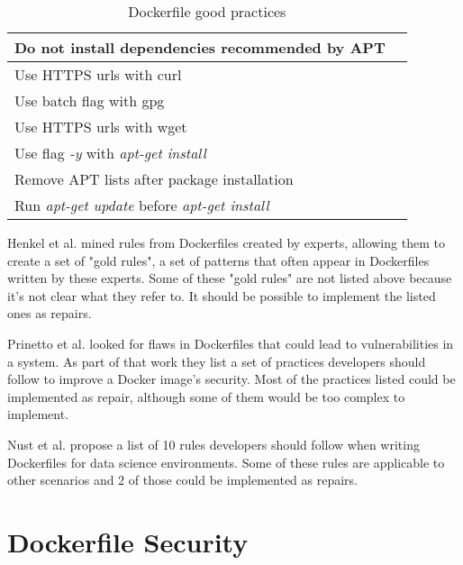 \begin{table}[H]
\begin{tabular}{|p{}|p{}|}
        \hline Do not install dependencies recommended by APT & \cite{henkelLearningUnderstandingSupporting2020} \\
        \hline Use HTTPS urls with curl & \cite{henkelLearningUnderstandingSupporting2020} \\
        \hline Use batch flag with gpg & \cite{henkelLearningUnderstandingSupporting2020} \\
        \hline Use HTTPS urls with wget & \cite{henkelLearningUnderstandingSupporting2020} \\
        \hline Use flag \textit{-y} with \textit{apt-get install} & \cite{henkelLearningUnderstandingSupporting2020} \\
        \hline Remove APT lists after package installation & \cite{henkelLearningUnderstandingSupporting2020} \\
        \hline Run \textit{apt-get update} before \textit{apt-get install} & \cite{henkelLearningUnderstandingSupporting2020} \\
        \hline
    \end{tabular}
    \caption{Dockerfile good practices}
    \label{tab:dockerfile_good_practices}
\end{table}

Henkel et al. \cite{henkelLearningUnderstandingSupporting2020} mined rules from Dockerfiles created by experts, allowing them to create a set of "gold rules", a set of patterns that often appear in Dockerfiles written by these experts. Some of these "gold rules" are not listed above because it's not clear what they refer to. It should be possible to implement the listed ones as repairs.

Prinetto et al. \cite{prinettoSecurityMisconfigurationsDetection} looked for flaws in Dockerfiles that could lead to vulnerabilities in a system. As part of that work they list a set of practices developers should follow to improve a Docker image's security. Most of the practices listed could be implemented as repair, although some of them would be too complex to implement.

Nust et al. \cite{nustTenSimpleRules2020} propose a list of 10 rules developers should follow when writing Dockerfiles for data science environments. Some of these rules are applicable to other scenarios and 2 of those could be implemented as repairs.

\section{Dockerfile Security} \label{sec:dockerfile_security}

